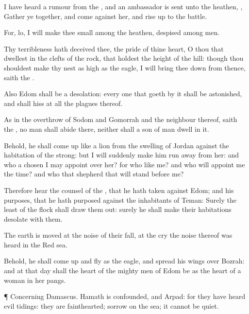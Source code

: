 {I have
heard a
rumour from the
{}, and an
ambassador is
sent unto the
heathen,
{}, Gather ye
together, and
come against her, and rise
up to the
battle.

For, lo, I will
make thee
small among the
heathen,
{}
despised among
men.

Thy
terribleness hath
deceived thee,
{} the
pride of thine
heart, O thou that
dwellest in the
clefts of the
rock, that
holdest the
height of the
hill: though thou shouldest make thy
nest as
high as the
eagle, I will bring thee
down from thence,
saith the
{}.

Also
Edom shall be a
desolation: every one that
goeth by it shall be
astonished, and shall
hiss at all the
plagues thereof.

As in the
overthrow of
Sodom and
Gomorrah and the
neighbour
{} thereof,
saith the
{}, no
man shall
abide there, neither shall a
son of
man
dwell in it.

Behold, he shall come
up like a
lion from the
swelling of
Jordan against the
habitation of the
strong: but I will
suddenly make him run
away from her: and who
{} a
chosen
{} I may
appoint over her? for who
{} like me? and who will appoint me the
time? and who
{} that
shepherd that will
stand
before me?

Therefore
hear the
counsel of the
{}, that he hath
taken against
Edom; and his
purposes, that he hath
purposed against the
inhabitants of
Teman: Surely the
least of the
flock shall draw them
out: surely he shall make their
habitations
desolate with them.

The
earth is
moved at the
noise of their
fall, at the
cry the
noise thereof was
heard in the
Red
sea.

Behold, he shall come
up and
fly as the
eagle, and
spread his
wings over
Bozrah: and at that
day shall the
heart of the mighty
men of
Edom be as the
heart of a
woman in her
pangs.


\par }{\PP {}¶ Concerning
Damascus.
Hamath is
confounded, and
Arpad: for they have
heard
evil
tidings: they are
fainthearted;
{}
sorrow on the
sea; it
cannot be
quiet.

}
